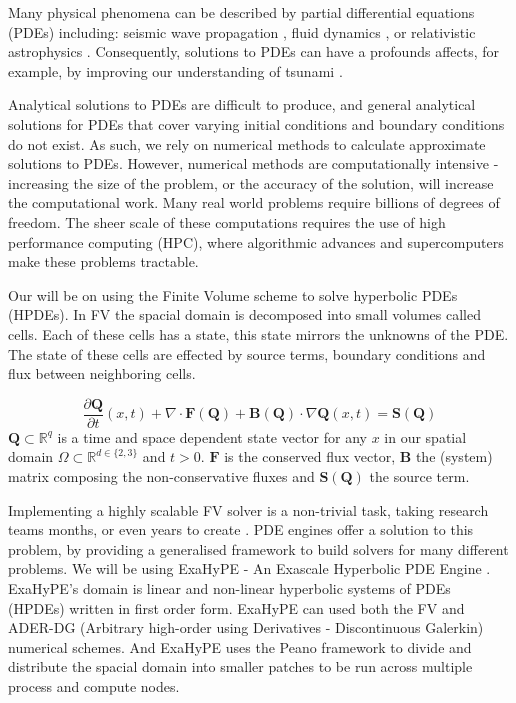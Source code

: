 Many physical phenomena can be described by partial differential equations (PDEs) including:  seismic wave propagation \cite{earthquakePDE}, fluid dynamics \cite{exahype}, or relativistic astrophysics \cite{relativisticPDE}.
Consequently, solutions to PDEs can have a profounds affects, for example, by improving our understanding of tsunami \cite{tsunamiPDE}.


Analytical solutions to PDEs are difficult to produce, and general analytical solutions for PDEs that cover varying initial conditions and boundary conditions do not exist.
As such, we rely on numerical methods to calculate approximate solutions to PDEs.
However, numerical methods are computationally intensive - increasing the size of the problem, or the accuracy of the solution, will increase the computational work.
Many real world problems require billions of degrees of freedom.
The sheer scale of these computations requires the use of high performance computing (HPC), where algorithmic advances and supercomputers make these problems tractable.

Our will be on using the Finite Volume scheme to solve hyperbolic PDEs (HPDEs).
In FV the spacial domain is decomposed into small volumes called cells.
Each of these cells has a state, this state mirrors the unknowns of the PDE.
The state of these cells are effected by source terms, boundary conditions and flux between neighboring cells.

\begin{equation}
\frac{\partial \mathbf{Q}}{\partial t}(x,t) + \nabla \cdot \mathbf{F}(\mathbf{Q}) + \mathbf{B}(\mathbf{Q}) \cdot \nabla \mathbf{Q}(x,t) = \mathbf{S}(\mathbf{Q})
\end{equation}
$\mathbf{Q}\subset \mathbb{R}^q$ is a time and space dependent state vector for any $x$ in our spatial domain $\Omega\subset \mathbb{R}^{d \in \{2,3\}}$ and $t>0$.
$\mathbf{F}$ is the conserved flux vector, $\mathbf{B}$ the (system) matrix composing the non-conservative fluxes and $\mathbf{S}(\mathbf{Q})$ the source term.


Implementing a highly scalable FV solver is a non-trivial task, taking research teams months, or even years to create \cite{tensorChemistry}.
PDE engines offer a solution to this problem, by providing a generalised framework to build solvers for many different problems.
We will be using ExaHyPE - An Exascale Hyperbolic PDE Engine \cite{exahype}.
ExaHyPE's domain is linear and non-linear hyperbolic systems of PDEs (HPDEs) written in first order form. 
ExaHyPE can used both the FV and ADER-DG (Arbitrary high-order using Derivatives - Discontinuous Galerkin) numerical schemes.
And ExaHyPE uses the Peano framework \cite{PeanoFramework} to divide and distribute the spacial domain into smaller patches to be run across multiple process and compute nodes.

